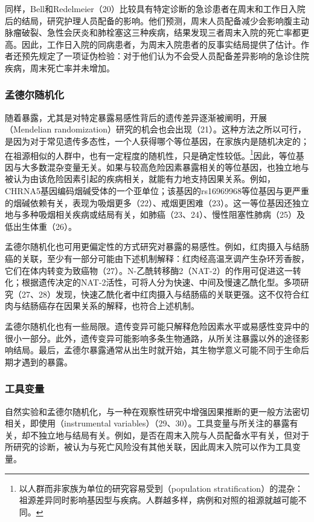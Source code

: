 同样，Bell和Redelmeier（20）比较具有特定诊断的急诊患者在周末和工作日入院后的结局，研究护理人员配备的影响。他们预测，周末人员配备减少会影响腹主动脉瘤破裂、急性会厌炎和肺栓塞这三种疾病，结果发现三者周末入院的死亡率都更高。因此，工作日入院的同病患者，为周末入院患者的反事实结局提供了估计。作者还预先规定了一项证伪检验：对于他们认为不会受人员配备差异影响的急诊住院疾病，周末死亡率并未增加。

\subsubsection{孟德尔随机化}
随着暴露，尤其是对特定暴露易感性背后的遗传差异逐渐被阐明，开展（Mendelian randomization）研究的机会也会出现（21）。这种方法之所以可行，是因为对于常见遗传多态性，一个人获得哪个等位基因，在家族内是随机决定的；在祖源相似的人群中，也有一定程度的随机性，只是确定性较低。\footnote{以人群而非家族为单位的研究容易受到（population stratification）的混杂：祖源差异同时影响基因型与疾病。人群越多样，病例和对照的祖源就越可能不同。}因此，等位基因与大多数混杂变量无关。如果与较高危险因素暴露相关的等位基因，也独立地与被认为由该危险因素引起的疾病相关，就能有力地支持因果关系。例如，CHRNA5基因编码烟碱受体的一个亚单位；该基因的rs16969968等位基因与更严重的烟碱依赖有关，表现为吸烟更多（22）、戒烟更困难（23）。这一等位基因还独立地与多种吸烟相关疾病或结局有关，如肺癌（23、24）、慢性阻塞性肺病（25）及低出生体重（26）。

孟德尔随机化也可用更偏定性的方式研究对暴露的易感性。例如，红肉摄入与结肠癌的关联，至少有一部分可能由下述机制解释：红肉经高温烹调产生杂环芳香胺，它们在体内转变为致癌物（27）。N-乙酰转移酶2（NAT-2）的作用可促进这一转化；根据遗传决定的NAT-2活性，可将人分为快速、中间及慢速乙酰化型。多项研究（27、28）发现，快速乙酰化者中红肉摄入与结肠癌的关联更强。这不仅符合红肉与结肠癌存在因果关系的解释，也符合上述机制。

孟德尔随机化也有一些局限。遗传变异可能只解释危险因素水平或易感性变异中的很小一部分。此外，遗传变异可能影响多条生物通路，从所关注暴露以外的途径影响结局。最后，孟德尔暴露通常从出生时就开始，其生物学意义可能不同于生命后期才遇到的暴露。

\subsubsection{工具变量}
自然实验和孟德尔随机化，与一种在观察性研究中增强因果推断的更一般方法密切相关，即使用（instrumental variables）（29、30）。工具变量与所关注的暴露有关，却不独立地与结局有关。例如，是否在周末入院与人员配备水平有关，但对于所研究的诊断，被认为与死亡风险没有其他关联，因此周末入院可以作为工具变量。

